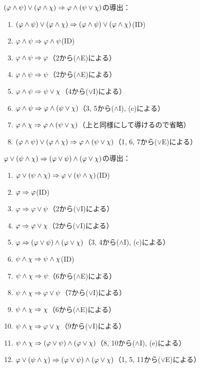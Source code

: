 \(\paren{\varphi \land \psi} \lor \paren{\varphi \land \chi} \sequent \varphi \land \paren{\psi \lor \chi}\)の導出：
\begin{enumerate}
	\item \(\paren{\varphi \land \psi} \lor \paren{\varphi \land \chi} \sequent \paren{\varphi \land \psi} \lor \paren{\varphi \land \chi}\)\quad (ID)
	\item \(\varphi \land \psi \Rightarrow \varphi \land \psi\)\quad (ID)
	\item \(\varphi \land \psi \Rightarrow \varphi\)\quad （2から(\(\land\)E)による）
	\item \(\varphi \land \psi \Rightarrow \psi\)\quad （2から(\(\land\)E)による）
	\item \(\varphi \land \psi \Rightarrow \psi \lor \chi\)\quad （4から(\(\lor\)I)による）
	\item \(\varphi \land \psi \sequent \varphi \land \paren{\psi \lor \chi}\)\quad （3, 5から(\(\land\)I), (c)による）
	\item \(\varphi \land \chi \sequent \varphi \land \paren{\psi \lor \chi}\)\quad （上と同様にして導けるので省略）
	\item \(\paren{\varphi \land \psi} \lor \paren{\varphi \land \chi} \sequent \varphi \land \paren{\psi \lor \chi}\)\quad （1, 6, 7から(\(\lor\)E)による）
\end{enumerate}

\(\varphi \lor \paren{\psi \land \chi} \sequent \paren{\varphi \lor \psi} \land \paren{\varphi \lor \chi}\)の導出：
\begin{enumerate}
	\item \(\varphi \lor \paren{\psi \land \chi} \sequent \varphi \lor \paren{\psi \land \chi}\)\quad (ID)
	\item \(\varphi \Rightarrow \varphi\)\quad (ID)
	\item \(\varphi \Rightarrow \varphi \lor \psi\)\quad （2から(\(\lor\)I)による）
	\item \(\varphi \Rightarrow \varphi \lor \chi\)\quad （2から(\(\lor\)I)による）
	\item \(\varphi \sequent \paren{\varphi \lor \psi} \land \paren{\varphi \lor \chi}\)\quad （3, 4から(\(\land\)I), (c)による）
	\item \(\psi \land \chi \Rightarrow \psi \land \chi\)\quad (ID)
	\item \(\psi \land \chi \Rightarrow \psi\)\quad （6から(\(\land\)E)による）
	\item \(\psi \land \chi \Rightarrow \varphi \lor \psi\)\quad （7から(\(\lor\)I)による）
	\item \(\psi \land \chi \Rightarrow \chi\)\quad （6から(\(\land\)E)による）
	\item \(\psi \land \chi \Rightarrow \varphi \lor \chi\)\quad （9から(\(\lor\)I)による）
	\item \(\psi \land \chi \sequent \paren{\varphi \lor \psi} \land \paren{\varphi \lor \chi}\)\quad （8, 10から(\(\land\)I), (e)による）
	\item \(\varphi \lor \paren{\psi \land \chi} \sequent \paren{\varphi \lor \psi} \land \paren{\varphi \lor \chi}\)\quad （1, 5, 11から(\(\lor\)E)による）
\end{enumerate}

